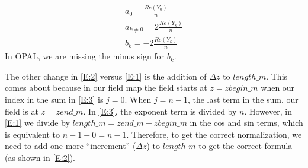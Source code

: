 \documentclass{report}
\begin{document}
\begin{equation*}
  \begin {aligned}
    a_{0} = \frac{Re\left(Y_{0}\right)}{n} \\
    a_{k \ne 0} = 2 \frac{Re\left(Y_{k}\right)}{n} \\
    b_{k} = - 2 \frac{Re\left(Y_{k}\right)}{n}
  \end{aligned}
\end{equation*}
In OPAL, we are missing the minus sign for $b_{k}$.

The other change in \eqref{E:2} versus \eqref{E:1} is the addition of $\Delta z$ to $length\_m$. This comes about because
in our field map the field starts at $z = zbegin\_m$ when our index in the sum in \eqref{E:3} is $j = 0$. When $j = n - 1$, the
last term in the sum, our field is at $z = zend\_m$. In \eqref{E:3}, the exponent term is divided by $n$. However, in \eqref{E:1}
we divide by $length\_m = zend\_m - zbegin\_m$ in the cos and sin terms, which is equivalent to $n - 1 - 0 = n - 1$. Therefore,
to get the correct normalization, we need to add one more ``increment'' ($\Delta z$) to $length\_m$ to get the correct
formula (as shown in \eqref{E:2}).
\end{document}
